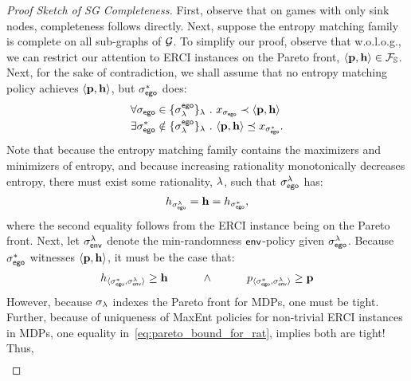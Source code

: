 \begin{proof}[Proof Sketch of SG Completeness]
  First, observe that on games with only sink nodes, completeness
  follows directly.  Next, suppose the entropy matching family is
  complete on all sub-graphs of $\mathcal{G}$. To simplify our proof, observe
  that w.o.l.o.g., we can restrict our attention to ERCI instances
  on the Pareto front, $\langle \mathbf{p},\mathbf{h}\rangle \in \mathcal{F}_{\mathbb{S}}$.
  Next, for the sake of contradiction, we shall assume that no entropy
  matching policy achieves $\langle \mathbf{p},\mathbf{h}\rangle$,
  but $\sigma_{\mathsf{ego}}^*$ does:
  \begin{align}
    &\forall \sched_\pOne \in \{\sched^{\pOne}_\rat\}_\rat~.~ x_{\sched_{\pOne}} \prec \langle \scthreshold, \randomness \rangle\label{eq:reject}\\
    &\exists \sched_\pOne^* \notin \{\sched^{\pOne}_\rat\}_\rat~.~  \langle \scthreshold, \randomness \rangle \preceq x_{\sched_{\pOne}^*}\label{eq:incomplete}.
  \end{align}
  Note that because the entropy matching family contains the maximizers and minimizers
  of entropy, and because increasing rationality monotonically decreases entropy,
  there must exist some rationality, $\lambda$, such that $\sigma_{\mathsf{ego}}^\lambda$ has:
  \begin{equation}
    h_{\sigma_{\mathsf{ego}}^\lambda} = \mathbf{h} = h_{\sigma_{\mathsf{ego}}^*},
  \end{equation}
  where the second equality follows from the ERCI instance being on the Pareto front.
  Next, let $\sigma_{\mathsf{env}}^\lambda$ denote the min-randomness
  $\mathsf{env}$-policy given $\sigma_{\mathsf{ego}}^{\lambda}$. Because $\sigma_{\mathsf{ego}}^*$
  witnesses $\langle\mathbf{p}, \mathbf{h}\rangle$, it must be the case
  that:
  \begin{equation}\label{eq:pareto_bound_for_rat}
    \rndp_{\langle \sched_\pOne^*, \sched_\pTwo^\rat \rangle} \geq \randomness
    \hspace{3em} \wedge \hspace{3em}
    \scp_{\langle \sched_\pOne^*, \sched_\pTwo^\rat\rangle} \geq \scthreshold
  \end{equation}
  However, because $\sigma_\lambda$ indexes the Pareto front for MDPs,
  one must be tight. Further, because of uniqueness of MaxEnt policies
  for non-trivial ERCI instances in MDPs, one equality
  in~\eqref{eq:pareto_bound_for_rat}, implies both are tight! Thus,
  \begin{equation}
    \begin{split}

\end{split}
\end{equation}
\end{proof}
